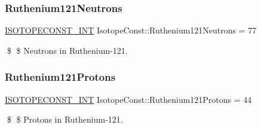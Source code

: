 \subsubsection{\texorpdfstring{Ruthenium121\+Neutrons}{Ruthenium121Neutrons}}
{\footnotesize\ttfamily \mbox{\hyperlink{group___isotope_const-_macros_ga5f18360b3e99483a35c32d789e62621c}{I\+S\+O\+T\+O\+P\+E\+C\+O\+N\+S\+T\+\_\+\+I\+NT}} Isotope\+Const\+::\+Ruthenium121\+Neutrons = 77}

\$ \$ Neutrons in Ruthenium-\/121. \mbox{\label{group___isotope_const-_ruthenium-_ru121_ga128107fc4dcfb55a31e6ba2ea33efa5e}} 
\subsubsection{\texorpdfstring{Ruthenium121\+Protons}{Ruthenium121Protons}}
{\footnotesize\ttfamily \mbox{\hyperlink{group___isotope_const-_macros_ga5f18360b3e99483a35c32d789e62621c}{I\+S\+O\+T\+O\+P\+E\+C\+O\+N\+S\+T\+\_\+\+I\+NT}} Isotope\+Const\+::\+Ruthenium121\+Protons = 44}

\$ \$ Protons in Ruthenium-\/121. 